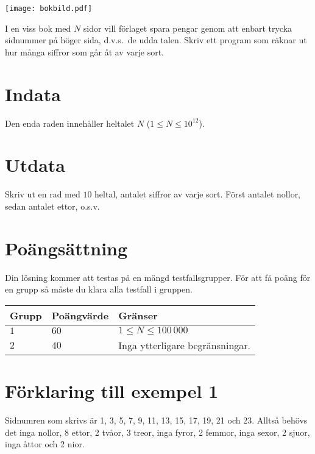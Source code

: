 
\begin{center}
\texttt{[image: bokbild.pdf]}
\end{center}
 
I en viss bok med $N$ sidor vill förlaget spara pengar genom att enbart trycka
sidnummer på höger sida, d.v.s.\ de udda talen. Skriv ett program som
räknar ut hur många siffror som går åt av varje sort.

\section*{Indata}
Den enda raden innehåller heltalet $N$ ($1 \leq N \leq 10^12$).

\section*{Utdata}
Skriv ut en rad med $10$ heltal, antalet siffror av varje sort. Först antalet nollor, sedan antalet ettor, o.s.v.


\section*{Poängsättning}
Din lösning kommer att testas på en mängd testfallsgrupper.
För att få poäng för en grupp så måste du klara alla testfall i gruppen.

\noindent
\begin{tabular}{| l | l | l |}
\hline
  Grupp & Poängvärde & Gränser \\ \hline
  $1$    & $60$       &  $1 \le N \le 100\,000$   \\ \hline 
  $2$    & $40$       &  Inga ytterligare begränsningar. \\ \hline
\end{tabular}


\section*{Förklaring till exempel 1}

Sidnumren som skrivs är 1, 3, 5, 7, 9, 11, 13, 15,
17, 19, 21 och 23. Alltså behövs det inga nollor, 8 ettor, 2 tvåor, 3
treor, inga fyror, 2 femmor, inga sexor, 2 sjuor, inga åttor och 2 nior.


